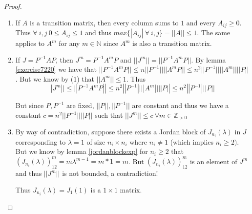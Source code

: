 \documentclass{amsart}
\theoremstyle{definition}
\theoremstyle{remark}
\numberwithin{equation}{section}
\begin{document}
\begin{proof} \leavevmode

\begin{enumerate}


    \item
        If $A$ is a transition matrix, then every column sums to $1$ and every $A_{ij} \geq 0$.
        Thus $\forall\ i, j\ 0 \leq A_{ij} \leq 1$ and thus $ max \{|A_{ij}|\ \forall\ i, j \} = ||A|| \leq
        1$. The same applies to $A^m$ for any $m \in \mathbb{N}$
        since $A^m$ is also a transition matrix.


    \item
        If $J = P^{-1}AP$, then $J^m  = P^{-1}A^mP$ and $||J^m|| = || P^{-1}A^mP
        ||$.
        By lemma \ref{exercise7220} we have that $|| P^{-1}A^mP || \leq n||P^{-1}||||A^mP|| \leq n^2 ||P^{-1}|| ||A^m||| |P||$.
        But we know by (1) that $||A^m|| \leq 1$.
        Thus
        $$ |J^m|| \leq || P^{-1}A^mP || \leq n^2 ||P^{-1}|| ||A^m||| |P|| \leq n^2 ||P^{-1}|| |P||$$

        But since $P, P^{-1}$ are fixed, $||P||, ||P^{-1}||$ are constant and thus we have a constant $c = n^2 ||P^{-1}|| ||P||$ such that $||J^m|| \leq c\ \forall m \in \mathbb{Z}_{>0}$


    \item \label{jordan1size}
        By way of contradiction, suppose there exists a  Jordan block of $J_{n_i}(\lambda)$ in $J$ corresponding to $\lambda = 1$ of size $n_i \times n_i$ where $n_i \neq 1$ (which implies $n_i \geq 2)$.
        But we know by lemma \ref{jordanblockexp} for $n_i \geq 2$ that $(J_{n_i}(\lambda))^{m}_{12} = m \lambda^{m -1} = m * 1 = m$.
        But $(J_{n_i}(\lambda))^{m}_{12}$ is an element of $J^m$ and thus $||J^m||$ is not bounded, a contradiction!

        Thus $J_{n_i}(\lambda) = J_1(1)$ is a $1 \times 1 $ matrix.



\end{enumerate}


\end{proof}
\end{document}
